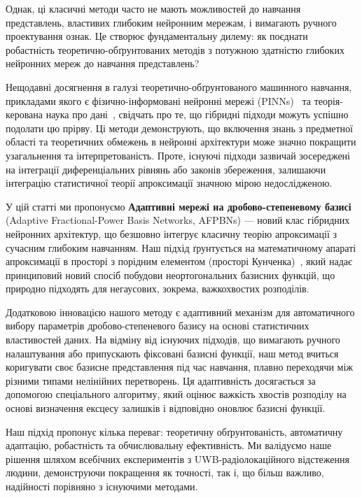 \documentclass[12pt,a4paper]{article}
\begin{document}
	Однак, ці класичні методи часто не мають можливостей до навчання представлень, властивих глибоким нейронним мережам, і вимагають ручного проектування ознак. Це створює фундаментальну дилему: як поєднати робастність теоретично-обґрунтованих методів з потужною здатністю глибоких нейронних мереж до навчання представлень?
	
	Нещодавні досягнення в галузі теоретично-обґрунтованого машинного навчання, прикладами якого є фізично-інформовані нейронні мережі (PINNs)~\cite{raissi2019physics} та теорія-керована наука про дані~\cite{karpatne2017theory}, свідчать про те, що гібридні підходи можуть успішно подолати цю прірву. Ці методи демонструють, що включення знань з предметної області та теоретичних обмежень в нейронні архітектури може значно покращити узагальнення та інтерпретованість. Проте, існуючі підходи зазвичай зосереджені на інтеграції диференціальних рівнянь або законів збереження, залишаючи інтеграцію статистичної теорії апроксимації значною мірою недослідженою.
	
	У цій статті ми пропонуємо \textbf{Адаптивні мережі на дробово-степеневому базисі} (Adaptive Fractional-Power Basis Networks, AFPBNs) --- новий клас гібридних нейронних архітектур, що безшовно інтегрує класичну теорію апроксимації з сучасним глибоким навчанням. Наш підхід ґрунтується на математичному апараті апроксимації в просторі з порідним елементом (просторі Кунченка)~\cite{kunchenko2003polynomial}, який надає принциповий новий спосіб побудови неортогональних базисних функцій, що природно підходять для негаусових, зокрема, важкохвостих розподілів.
	
	Додатковою інновацією нашого методу є адаптивний механізм для автоматичного вибору параметрів дробово-степеневого базису на основі статистичних властивостей даних. На відміну від існуючих підходів, що вимагають ручного налаштування або припускають фіксовані базисні функції, наш метод вчиться коригувати своє базисне представлення під час навчання, плавно переходячи між різними типами нелінійних перетворень. Ця адаптивність досягається за допомогою спеціального алгоритму, який оцінює важкість хвостів розподілу на основі визначення ексцесу залишків і відповідно оновлює базисні функції.
	
	Наш підхід пропонує кілька переваг: теоретичну обґрунтованість, автоматичну адаптацію, робастність та обчислювальну ефективність. Ми валідуємо наше рішення шляхом всебічних експериментів з UWB-радіолокаційного відстеження людини, демонструючи покращення як точності, так і, що більш важливо, надійності порівняно з існуючими методами.
	
\end{document}

